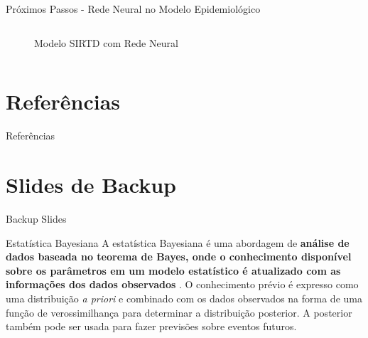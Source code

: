 \documentclass[aspectratio=169]{beamer}                    %
\begin{document}
\begin{frame}{Próximos Passos - Rede Neural no Modelo Epidemiológico}
\begin{columns}
\begin{column}{0.6\textwidth}
\begin{figure}
                \label{fig:SIRTD_neuralnetwork}
                \caption{Modelo SIRTD com Rede Neural}
            \end{figure}
        \end{column}
    \end{columns}
\end{frame}

\section{Referências}
\begin{frame}[allowframebreaks]{Referências}
    \printbibliography
\end{frame}

\appendix %
\section*{Slides de Backup}
\begin{frame}
    \centering
    \vfill
    {\fontsize{40}{50}\selectfont Backup Slides}
    \vfill
\end{frame}

\begin{frame}{Estatística Bayesiana}
    A estatística Bayesiana
    é uma abordagem de \textbf{análise de dados baseada no teorema de Bayes,
    onde o conhecimento disponível sobre os parâmetros em um modelo estatístico
    é atualizado com as informações dos dados observados}
    \parencite{gelman2013bayesian, mcelreath2020statistical}. O conhecimento prévio é expresso como
    uma distribuição
    \textit{a priori}
    e combinado com os dados observados na forma de uma função de
    verossimilhança
    para determinar a distribuição
    posterior.
    A posterior também pode ser usada para fazer previsões sobre eventos futuros.
\end{frame}
\end{document}
